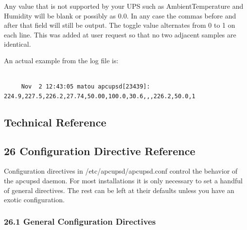 Any value that is not supported by your UPS such as AmbientTemperature and
Humidity will be blank or possibly as 0.0. In any case the commas before and
after that field will still be output. The toggle value alternates from 0 to 1
on each line. This was added at user request so that no two adjacent samples
are identical.  

An actual example from the log file is: 

\footnotesize
\begin{verbatim}
     
     Nov  2 12:43:05 matou apcupsd[23439]: 224.9,227.5,226.2,27.74,50.00,100.0,30.6,,,226.2,50.0,1
\end{verbatim}
\normalsize

\label{Technical-Reference}

\subsection*{Technical Reference}

\label{index-Technical-Reference-235}

\label{Configuration-Directive-Reference}

\subsection*{26 Configuration Directive Reference}

\label{index-Reference_002c-Directives-236}
\label{index-Configuration_002c-Directives-237}
\label{index-Directives-238}
Configuration directives in /etc/apcupsd/apcupsd.conf control the behavior of
the apcupsd daemon.  For most installations it is only necessary to set a
handful of general directives. The rest can be left at their defaults unless
you have an exotic configuration. 

\label{General-Configuration-Directives}

\subsubsection*{26.1 General Configuration Directives}

